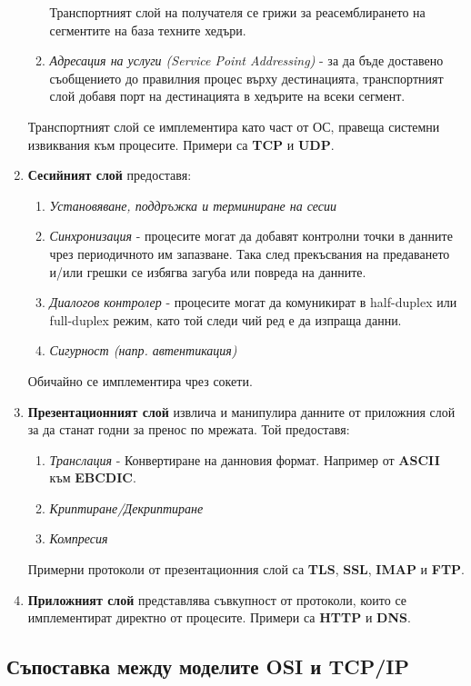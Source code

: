 \documentclass[fleqn,12pt]{article}
\begin{document}
\begin{flushleft}
\begin{enumerate}
\begin{enumerate}
        Транспортният слой на получателя се грижи за реасемблирането на сегментите на база техните хедъри.
        \item \textit{Адресация на услуги (Service Point Addressing)} - за да бъде доставено съобщението до правилния процес върху дестинацията, транспортният слой добавя порт на дестинацията в хедърите на всеки сегмент.
    \end{enumerate}
    Транспортният слой се имплементира като част от ОС, правеща системни извиквания към процесите. Примери са \textbf{TCP} и \textbf{UDP}.
    \item \textbf{Сесийният слой} предоставя:
    \begin{enumerate}
        \item \textit{Установяване, поддръжка и терминиране на сесии}
        \item \textit{Синхронизация} - процесите могат да добавят контролни точки в данните чрез периодичното им запазване.
        Така след прекъсвания на предаването и/или грешки се избягва загуба или повреда на данните.
        \item \textit{Диалогов контролер} - процесите могат да комуникират в half-duplex или full-duplex режим, като той следи чий ред е да изпраща данни.
        \item \textit{Сигурност (напр. автентикация)}
    \end{enumerate}
    Обичайно се имплементира чрез сокети.
    \item \textbf{Презентационният слой} извлича и манипулира данните от приложния слой за да станат годни за пренос по мрежата. Той предоставя:
    \begin{enumerate}
        \item \textit{Транслация} - Конвертиране на данновия формат. Например от \textbf{ASCII} към \textbf{EBCDIC}.
        \item \textit{Криптиране/Декриптиране}
        \item \textit{Компресия}
    \end{enumerate}
    Примерни протоколи от презентационния слой са \textbf{TLS}, \textbf{SSL}, \textbf{IMAP} и \textbf{FTP}.
    \item \textbf{Приложният слой} представлява съвкупност от протоколи, които се имплементират директно от процесите. Примери са \textbf{HTTP} и \textbf{DNS}.
\end{enumerate}

\subsection{Съпоставка между моделите OSI и TCP/IP}


\end{flushleft}
\end{document}
